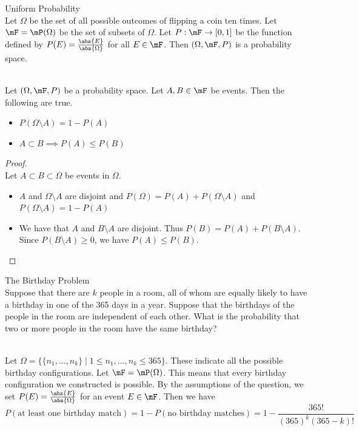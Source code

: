 \documentclass[a4paper]{article}
\begin{document}
\begin{eg}{Uniform Probability}{}\\
Let $\Omega$ be the set of all possible outcomes of flipping a coin ten times. Let $\mF=\mP(\Omega)$ be the set of subsets of $\Omega$. Let $P:\mF\to[0,1]$ be the function defined by $P(E)=\frac{\abs{E}}{\abs{\Omega}}$ for all $E\in\mF$. Then $(\Omega,\mF,P)$ is a probability space. 
\end{eg}

\begin{prp}{}{}\\
Let $(\Omega,\mF,P)$ be a probability space. Let $A,B\in\mF$ be events. Then the following are true. 
\begin{itemize}
\item $P(\Omega\setminus A)=1-P(A)$
\item $A\subset B\implies P(A)\leq P(B)$
\end{itemize} 
\begin{proof}\\
Let $A\subset B\subset\Omega$ be events in $\Omega$. 
\begin{itemize}
\item $A$ and $\Omega\setminus A$ are disjoint and $P(\Omega)=P(A)+P(\Omega\setminus A)$ and $P(\Omega\setminus A)=1-P(A)$
\item We have that $A$ and $B\setminus A$ are disjoint. Thus $P(B)=P(A)+P(B\setminus A)$. Since $P(B\setminus A)\geq 0$, we have $P(A)\leq P(B)$.  
\end{itemize}
\end{proof}
\end{prp}

\begin{eg}{The Birthday Problem}{}\\
Suppose that there are $k$ people in a room, all of whom are equally likely to have a birthday in one of the 365 days in a year. Suppose that the birthdays of the people in the room are independent of each other. What is the probability that two or more people in the room have the same birthday?
\begin{answer}\\
Let $\Omega=\{\{n_1,\dots,n_k\}\;|\;1\leq n_1,\dots,n_k\leq 365\}$. These indicate all the possible birthday configurations. Let $\mF=\mP(\Omega)$. This means that every birthday configuration we constructed is possible. By the assumptions of the question, we set $P(E)=\frac{\abs{E}}{\abs{\Omega}}$ for an event $E\in\mF$. Then we have $$P(\text{at least one birthday match})=1-P(\text{no birthday matches})=1-\frac{365!}{(365)^k(365-k)!}$$
\end{answer}
\end{eg}
\end{document}
